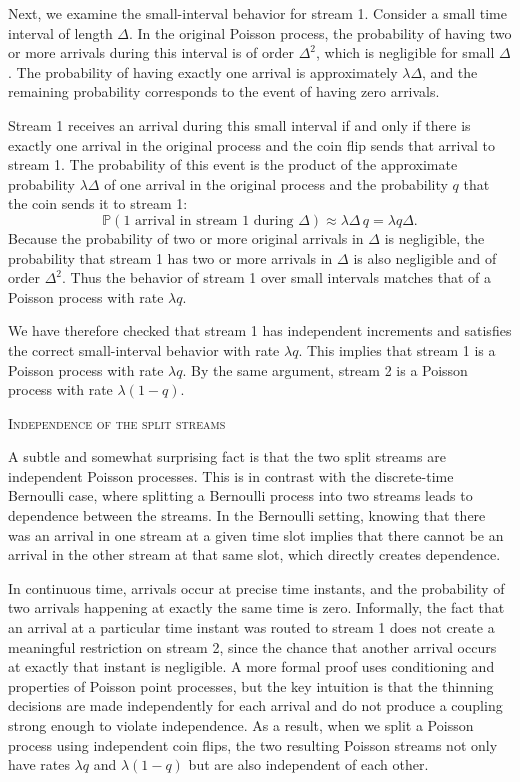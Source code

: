 Next, we examine the small-interval behavior for stream 1.  
Consider a small time interval of length \(\Delta\).  
In the original Poisson process, the probability of having two or more arrivals during this interval is of order \(\Delta^2\), which is negligible for small \(\Delta\).  
The probability of having exactly one arrival is approximately \(\lambda \Delta\), and the remaining probability corresponds to the event of having zero arrivals.  

Stream 1 receives an arrival during this small interval if and only if there is exactly one arrival in the original process and the coin flip sends that arrival to stream 1.  
The probability of this event is the product of the approximate probability \(\lambda \Delta\) of one arrival in the original process and the probability \(q\) that the coin sends it to stream 1:
\[
\mathbb{P}(\text{1 arrival in stream 1 during } \Delta)
\approx
\lambda \Delta \, q
=
\lambda q \Delta.
\]
Because the probability of two or more original arrivals in \(\Delta\) is negligible, the probability that stream 1 has two or more arrivals in \(\Delta\) is also negligible and of order \(\Delta^2\).  
Thus the behavior of stream 1 over small intervals matches that of a Poisson process with rate \(\lambda q\).  

We have therefore checked that stream 1 has independent increments and satisfies the correct small-interval behavior with rate \(\lambda q\).  
This implies that stream 1 is a Poisson process with rate \(\lambda q\).  
By the same argument, stream 2 is a Poisson process with rate \(\lambda (1-q)\).  

\bigskip
\textsc{Independence of the split streams}

A subtle and somewhat surprising fact is that the two split streams are independent Poisson processes.  
This is in contrast with the discrete-time Bernoulli case, where splitting a Bernoulli process into two streams leads to dependence between the streams.  
In the Bernoulli setting, knowing that there was an arrival in one stream at a given time slot implies that there cannot be an arrival in the other stream at that same slot, which directly creates dependence.  

In continuous time, arrivals occur at precise time instants, and the probability of two arrivals happening at exactly the same time is zero.  
Informally, the fact that an arrival at a particular time instant was routed to stream 1 does not create a meaningful restriction on stream 2, since the chance that another arrival occurs at exactly that instant is negligible.  
A more formal proof uses conditioning and properties of Poisson point processes, but the key intuition is that the thinning decisions are made independently for each arrival and do not produce a coupling strong enough to violate independence.  
As a result, when we split a Poisson process using independent coin flips, the two resulting Poisson streams not only have rates \(\lambda q\) and \(\lambda (1-q)\) but are also independent of each other.

